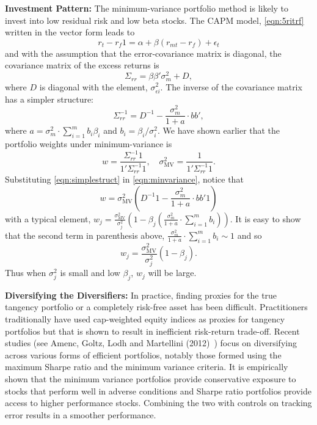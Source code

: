 \noindent\textbf{Investment Pattern:} The minimum-variance portfolio method is likely to invest into low residual risk and low beta stocks. The CAPM model, \eqref{eqn:5ritrf} written in the vector form leads to
	\begin{equation}\label{eqn:vectorform}
	r_t - r_f 1 = \alpha + \beta(r_{mt} - r_f) + \epsilon_t
	\end{equation}
and with the assumption that the error-covariance matrix is diagonal, the covariance matrix of the excess returns is
	\begin{equation}\label{eqn:Sigmarr}
	\Sigma_{rr}= \beta\beta' \sigma_m^2 + D,
	\end{equation}	
where $D$ is diagonal with the element, $\sigma_{\epsilon i}^2$. The inverse of the covariance matrix has a simpler structure:
	\begin{equation}\label{eqn:simplestruct}
	\Sigma_{rr}^{-1}= D^{-1} - \dfrac{\sigma_m^2}{1+a} \cdot bb',
	\end{equation}	
where $a=\sigma_m^2 \cdot \sum_{i=1}^m b_i \beta_i$ and $b_i= \beta_i/\sigma_i^2$. We have shown earlier that the portfolio weights under minimum-variance is
	\begin{equation} \label{eqn:minvariance}
	w= \dfrac{\Sigma_{rr}^{-1} 1}{1' \Sigma_{rr}^{-1} 1}, \quad \sigma_{\text{MV}}^2= \dfrac{1}{1' \Sigma_{rr}^{-1} 1}.
	\end{equation}	
Substituting \eqref{eqn:simplestruct} in \eqref{eqn:minvariance}, notice that 
	\begin{equation}  \label{eqn:wsubtitute}
	w= \sigma_{\text{MV}}^2 \left( D^{-1} 1 - \dfrac{\sigma_m^2}{1+a} \cdot bb' 1\right)
	\end{equation}
with a typical element, $w_j= \frac{\sigma_{\text{MV}}^2}{\sigma_j^2} \left(1 - \beta_j \left( \frac{\sigma_m^2}{1+a} \cdot \sum_{i=1}^m b_i \right) \right)$. It is easy to show that the second term in parenthesis above, $\frac{\sigma_m^2}{1+a} \cdot \sum_{i=1}^m b_i \sim 1$ and so
	\begin{equation} \label{eqn:wsubsecond}
	w_j= \dfrac{\sigma_{\text{MV}}^2}{\sigma_j^2} ( 1- \beta_j).
	\end{equation}
Thus when $\sigma_j^2$ is small and low $\beta_j$, $w_j$ will be large. \twomedskip


\noindent\textbf{Diversifying the Diversifiers:} In practice, finding proxies for the true tangency portfolio or a completely risk-free asset has been difficult. Practitioners traditionally have used cap-weighted equity indices as proxies for tangency portfolios but that is shown to result in inefficient risk-return trade-off. Recent studies (see Amenc, Goltz, Lodh and Martellini (2012)~\cite{amencgoltzlodhmart}) focus on diversifying across various forms of efficient portfolios, notably those formed using the maximum Sharpe ratio and the minimum variance criteria. It is empirically shown that the minimum variance portfolios provide conservative exposure to stocks that perform well in adverse conditions and Sharpe ratio portfolios provide access to higher performance stocks. Combining the two with controls on tracking error results in a smoother performance. 




